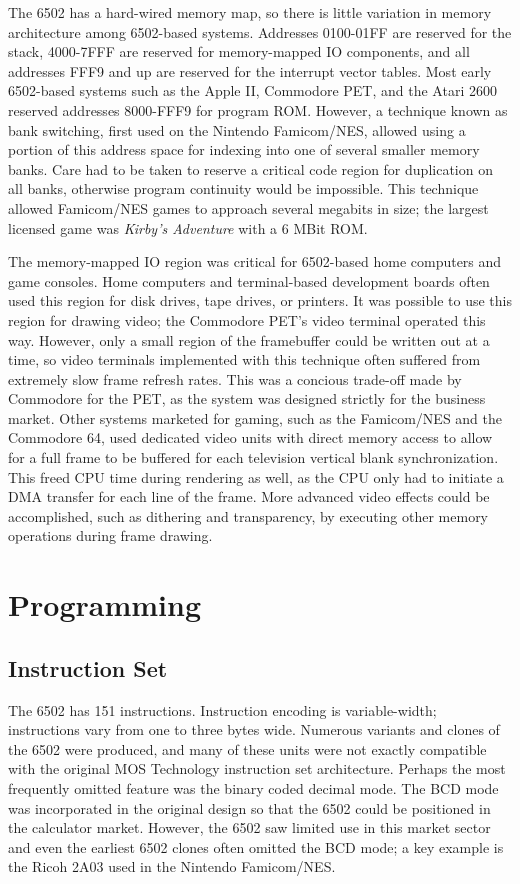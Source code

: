 \documentclass[journal]{IEEEtran}
\begin{document}
The 6502 has a hard-wired memory map, so there is little variation in memory
architecture among 6502-based systems. Addresses 0100-01FF are reserved for the
stack, 4000-7FFF are reserved for memory-mapped IO components, and all addresses
FFF9 and up are reserved for the interrupt vector tables. Most early 6502-based
systems such as the Apple II, Commodore PET, and the Atari 2600 reserved
addresses 8000-FFF9 for program ROM. However, a technique known as bank
switching, first used on the Nintendo Famicom/NES, allowed using a portion of
this address space for indexing into one of several smaller memory banks. Care
had to be taken to reserve a critical code region for duplication on all banks,
otherwise program continuity would be impossible. This technique allowed
Famicom/NES games to approach several megabits in size; the largest licensed
game was \emph{Kirby's Adventure} with a 6 MBit ROM.

The memory-mapped IO region was critical for 6502-based home computers and game
consoles. Home computers and terminal-based development boards often used this
region for disk drives, tape drives, or printers. It was possible to use this
region for drawing video; the Commodore PET's video terminal operated this way.
However, only a small region of the framebuffer could be written out at a time,
so video terminals implemented with this technique often suffered from extremely
slow frame refresh rates. This was a concious trade-off made by Commodore for
the PET, as the system was designed strictly for the business market. Other
systems marketed for gaming, such as the Famicom/NES and the Commodore 64, used
dedicated video units with direct memory access to allow for a full frame to be
buffered for each television vertical blank synchronization. This freed CPU time
during rendering as well, as the CPU only had to initiate a DMA transfer for
each line of the frame. More advanced video effects could be accomplished, such
as dithering and transparency, by executing other memory operations during frame
drawing.

\section{Programming}

\subsection{Instruction Set}

The 6502 has 151 instructions. Instruction encoding is variable-width;
instructions vary from one to three bytes wide. Numerous variants and clones of
the 6502 were produced, and many of these units were not exactly compatible with
the original MOS Technology instruction set architecture. Perhaps the most
frequently omitted feature was the binary coded decimal mode. The BCD mode was
incorporated in the original design so that the 6502 could be positioned in the
calculator market. However, the 6502 saw limited use in this market sector and
even the earliest 6502 clones often omitted the BCD mode; a key example is the
Ricoh 2A03 used in the Nintendo Famicom/NES.
\end{document}
